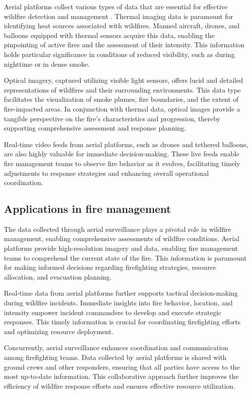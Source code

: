 \documentclass[
  12 pt,
]{Nemilov}
\begin{document}
Aerial platforms collect various types of data that are essential for effective wildfire detection and management \citep{allison2016airborne}. Thermal imaging data is paramount for identifying heat sources associated with wildfires. Manned aircraft, drones, and balloons equipped with thermal sensors acquire this data, enabling the pinpointing of active fires and the assessment of their intensity. This information holds particular significance in conditions of reduced visibility, such as during nighttime or in dense smoke.

Optical imagery, captured utilizing visible light sensors, offers lucid and detailed representations of wildfires and their surrounding environments. This data type facilitates the visualization of smoke plumes, fire boundaries, and the extent of fire-impacted areas. In conjunction with thermal data, optical images provide a tangible perspective on the fire's characteristics and progression, thereby supporting comprehensive assessment and response planning.

Real-time video feeds from aerial platforms, such as drones and tethered balloons, are also highly valuable for immediate decision-making. These live feeds enable fire management teams to observe fire behavior as it evolves, facilitating timely adjustments to response strategies and enhancing overall operational coordination.

\subsection{Applications in fire management}\label{applications-in-fire-management-1}

The data collected through aerial surveillance plays a pivotal role in wildfire management, enabling comprehensive assessments of wildfire conditions. Aerial platforms provide high-resolution imagery and data, enabling fire management teams to comprehend the current state of the fire. This information is paramount for making informed decisions regarding firefighting strategies, resource allocation, and evacuation planning.

Real-time data from aerial platforms further supports tactical decision-making during wildfire incidents. Immediate insights into fire behavior, location, and intensity empower incident commanders to develop and execute strategic responses. This timely information is crucial for coordinating firefighting efforts and optimizing resource deployment.

Concurrently, aerial surveillance enhances coordination and communication among firefighting teams. Data collected by aerial platforms is shared with ground crews and other responders, ensuring that all parties have access to the most up-to-date information. This collaborative approach further improves the efficiency of wildfire response efforts and ensures effective resource utilization.
\end{document}

